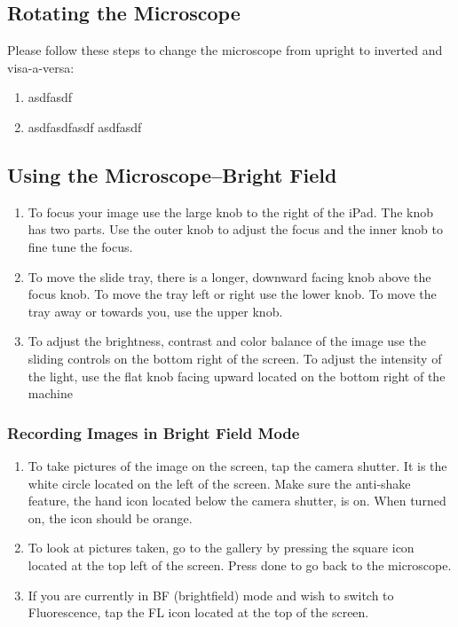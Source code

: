 \documentclass{article}
\begin{document}
  
\subsection{Rotating the Microscope}

Please follow these steps to change the microscope from upright to inverted and visa-a-versa:

\begin{enumerate}
  \item asdfasdf
  \item asdfasdfasdf asdfasdf
\end{enumerate}

\subsection{Using the Microscope--Bright Field} 

\begin{enumerate}
  \item To focus your image use the large knob to the right of the iPad. The knob has two parts. Use the outer knob to adjust the focus and the inner knob to fine tune the focus.
  \item To move the slide tray, there is a longer, downward facing knob above the focus knob. To move the tray left or right use the lower knob. To move the tray away or towards you, use the upper knob.
  \item To adjust the brightness, contrast and color balance of the image use the sliding controls on the bottom right of the screen. To adjust the intensity of the light, use the flat knob facing upward located on the bottom right of the machine
  
\end{enumerate}

\subsubsection{Recording Images in Bright Field Mode}

\begin{enumerate}
  \item To take pictures of the image on the screen, tap the camera shutter. It is the white circle located on the left of the screen. Make sure the anti-shake feature, the hand icon located below the camera shutter, is on. When turned on, the icon should be orange.
  \item To look at pictures taken, go to the gallery by pressing the square icon located at the top left of the screen. Press done to go back to the microscope. 
  \item If you are currently in BF (brightfield) mode and wish to switch to Fluorescence, tap the FL icon located at the top of the screen.  
\end{enumerate}
\end{document}
